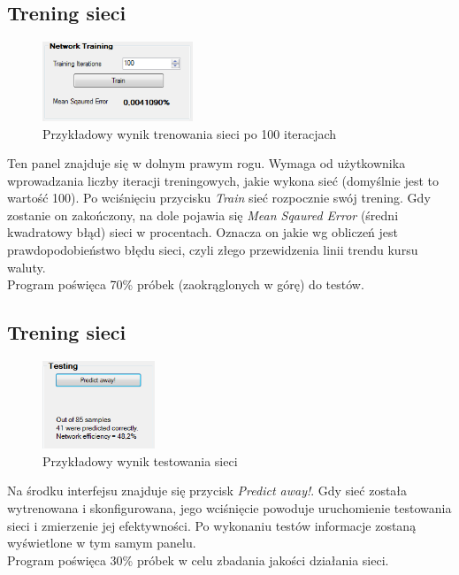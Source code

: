 \documentclass[a4paper]{article}
\begin{document}
			\subsection{Trening sieci}
				\begin{figure}[h!]
					\centering
					\includegraphics[width=0.40\textwidth]{./img/GUI_network_training}
					\caption{Przykładowy wynik trenowania sieci po 100 iteracjach}
				\end{figure}
				Ten panel znajduje się w dolnym prawym rogu. Wymaga od użytkownika wprowadzania liczby iteracji treningowych, jakie wykona sieć (domyślnie jest to wartość 100). Po wciśnięciu przycisku \emph{Train} sieć rozpocznie swój trening. Gdy zostanie on zakończony, na dole pojawia się \emph{Mean Sqaured Error} (średni kwadratowy błąd) sieci w procentach. Oznacza on jakie wg obliczeń jest prawdopodobieństwo błędu sieci, czyli złego przewidzenia linii trendu kursu waluty.\\\indent
				Program poświęca 70\% próbek (zaokrąglonych w górę) do testów.
			\newpage
			\subsection{Trening sieci}
				\begin{figure}[h!]
					\centering
					\includegraphics[width=0.30\textwidth]{./img/GUI_testing}
					\caption{Przykładowy wynik testowania sieci}
				\end{figure}
				Na środku interfejsu znajduje się przycisk \emph{Predict away!}. Gdy sieć została wytrenowana i skonfigurowana, jego wciśnięcie powoduje uruchomienie testowania sieci i zmierzenie jej efektywności. Po wykonaniu testów informacje zostaną wyświetlone w tym samym panelu.\\\indent Program poświęca 30\% próbek w celu zbadania jakości działania sieci.
\end{document}

